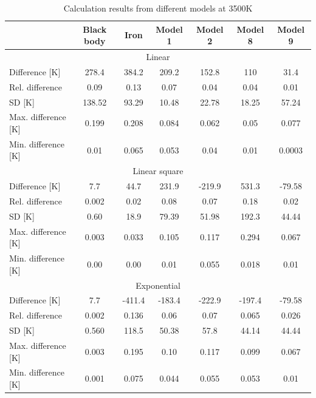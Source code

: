 {\linespread{1}
\begin{table}[htbp]
    \centering
    \caption{Calculation results from different models at 3500K}
    \label{tab: statistic_results_3500}
    \begin{tabular}{lcccccc}
        \hline
        & \multicolumn{1}{c}{Black body} & \multicolumn{1}{c}{Iron} & Model 1 & Model 2 & Model 8 & Model 9 \\ \hline
        \multicolumn{7}{c}{Linear}                                                                                                                                                         \\ \hline
        Difference {[}K{]}      & 278.4           & 384.2    & 209.2   & 152.8   & 110     & 31.4     \\
        Rel. difference         & 0.09            & 0.13     & 0.07    & 0.04    & 0.04    & 0.01     \\
        SD {[}K{]}              & 138.52          & 93.29    & 10.48   & 22.78   & 18.25   & 57.24    \\
        Max. difference {[}K{]} & 0.199           & 0.208    & 0.084   & 0.062   & 0.05    & 0.077    \\
        Min. difference {[}K{]} & 0.01            & 0.065    & 0.053   & 0.04    & 0.01    & 0.0003   \\ \hline
        \multicolumn{7}{c}{Linear square}                                                                                                                                                   \\ \hline
        Difference {[}K{]}      & 7.7             & 44.7     & 231.9   & -219.9  & 531.3   & -79.58   \\
        Rel. difference         & 0.002           & 0.02     & 0.08    & 0.07    & 0.18    & 0.02    \\
        SD {[}K{]}              & 0.60            & 18.9     & 79.39   & 51.98   & 192.3   & 44.44   \\
        Max. difference {[}K{]} & 0.003           & 0.033    & 0.105   & 0.117   & 0.294   & 0.067   \\
        Min. difference {[}K{]} & 0.00            & 0.00     & 0.01    & 0.055   & 0.018   & 0.01  \\ \hline
        \multicolumn{7}{c}{Exponential}                                                                                                                                                   \\ \hline
        Difference {[}K{]}      & 7.7             & -411.4   & -183.4  & -222.9  & -197.4  & -79.58   \\
        Rel. difference         & 0.002           & 0.136    & 0.06    & 0.07    & 0.065   & 0.026    \\
        SD {[}K{]}              & 0.560           & 118.5    & 50.38   & 57.8    & 44.14   & 44.44  \\
        Max. difference {[}K{]} & 0.003           & 0.195    & 0.10    & 0.117   & 0.099   & 0.067   \\
        Min. difference {[}K{]} & 0.001           & 0.075    & 0.044   & 0.055   & 0.053   & 0.01
        
    \end{tabular}
\end{table}
}